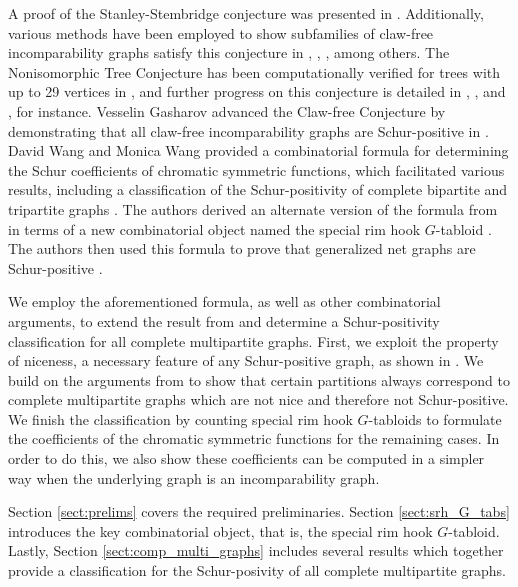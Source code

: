 \documentclass[12pt]{amsart}
\numberwithin{equation}{section}
\theoremstyle{plain}
\theoremstyle{definition}
\theoremstyle{remark}
\begin{document}
A proof of the Stanley-Stembridge conjecture was presented in \cite{hikita24}. Additionally, various methods have been employed to show subfamilies of claw-free incomparability graphs satisfy this conjecture in \cite{GebSag01}, \cite{Dahl18}, \cite{centered_at_vertex}, among others. The Nonisomorphic Tree Conjecture has been computationally verified for trees with up to 29 vertices in \cite{trees29}, and further progress on this conjecture is detailed in \cite{mar_mor}, \cite{OrSc14}, and \cite{foley22}, for instance. Vesselin Gasharov advanced the Claw-free Conjecture by demonstrating that all claw-free incomparability graphs are Schur-positive in \cite{gash_96}. David Wang and Monica Wang provided a combinatorial formula for determining the Schur coefficients of chromatic symmetric functions, which facilitated various results, including a classification of the Schur-positivity of complete bipartite and tripartite graphs \cite{WW2020}. The authors derived an alternate version of the formula from \cite{WW2020} in terms of a new combinatorial object named the special rim hook $G$-tabloid \cite{gen_nets}. The authors then used this formula to prove that generalized net graphs are Schur-positive \cite{gen_nets}.


We employ the aforementioned formula, as well as other combinatorial arguments, to extend the result from \cite{WW2020} and determine a Schur-positivity classification for all complete multipartite graphs. First, we exploit the property of niceness, a necessary feature of any Schur-positive graph, as shown in \cite{stan_98}. We build on the arguments from \cite{WW2020} to show that certain partitions always correspond to complete multipartite graphs which are not nice and therefore not Schur-positive. We finish the classification by counting special rim hook $G$-tabloids to formulate the coefficients of the chromatic symmetric functions for the remaining cases. In order to do this, we also show these coefficients can be computed in a simpler way when the underlying graph is an incomparability graph.


Section \ref{sect:prelims} covers the required preliminaries. Section \ref{sect:srh_G_tabs} introduces the key combinatorial object, that is, the special rim hook $G$-tabloid. Lastly, Section \ref{sect:comp_multi_graphs} includes several results which together provide a classification for the Schur-posivity of all complete multipartite graphs.
\end{document}
